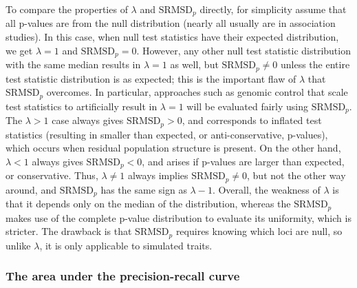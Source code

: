 \documentclass[11pt]{article}
\newcommand{\rmsd}{\text{SRMSD}_p}
\begin{document}
To compare the properties of $\lambda$ and $\rmsd$ directly, for simplicity assume that all p-values are from the null distribution (nearly all usually are in association studies).
In this case, when null test statistics have their expected distribution, we get $\lambda = 1$ and $\rmsd = 0$.
However, any other null test statistic distribution with the same median results in $\lambda = 1$ as well, but $\rmsd \ne 0$ unless the entire test statistic distribution is as expected; this is the important flaw of $\lambda$ that $\rmsd$ overcomes.
In particular, approaches such as genomic control \citep{devlin_genomic_1999} that scale test statistics to artificially result in $\lambda = 1$ will be evaluated fairly using $\rmsd$.
The $\lambda > 1$ case always gives $\rmsd > 0$, and corresponds to inflated test statistics (resulting in smaller than expected, or anti-conservative, p-values), which occurs when residual population structure is present.
On the other hand, $\lambda < 1$ always gives $\rmsd < 0$, and arises if p-values are larger than expected, or conservative.
Thus, $\lambda \ne 1$ always implies $\rmsd \ne 0$, but not the other way around, and $\rmsd$ has the same sign as $\lambda - 1$.
Overall, the weakness of $\lambda$ is that it depends only on the median of the distribution, whereas the $\rmsd$ makes use of the complete p-value distribution to evaluate its uniformity, which is stricter.
The drawback is that $\rmsd$ requires knowing which loci are null, so unlike $\lambda$, it is only applicable to simulated traits.

\subsubsection{The area under the precision-recall curve}
\end{document}
